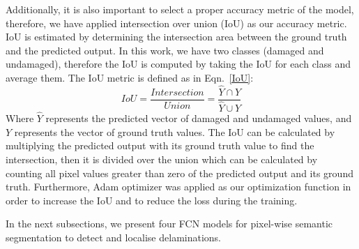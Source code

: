 \documentclass[runningheads]{llncs}
\begin{document}
Additionally, it is also important to select a proper accuracy metric of the model, therefore, we have applied intersection over union (IoU) as our accuracy metric. 
IoU is estimated by determining the intersection area between the ground truth and the predicted output.
In this work, we have two classes (damaged and undamaged), therefore the IoU is computed by taking the IoU for each class and average them.
The IoU metric is defined as in Eqn.~\ref{IoU}:
\begin{equation}
	IoU = \frac{Intersection}{Union} = \frac{\hat{Y} \cap Y}{\hat{Y} \cup Y} 
	\label{IoU}
\end{equation}
Where \(\hat{Y}\) represents the predicted vector of damaged and undamaged values, and \(Y\) represents the vector of ground truth values.
The IoU can be calculated by multiplying the predicted output with its ground truth value to find the intersection, then it is divided over the union which can be calculated by counting all pixel values greater than zero of the predicted output and its ground truth.
Furthermore, Adam optimizer was applied as our optimization function in order to increase the IoU and to reduce the loss during the training.

In the next subsections, we present four FCN models for pixel-wise semantic segmentation to detect and localise delaminations.
\end{document}
